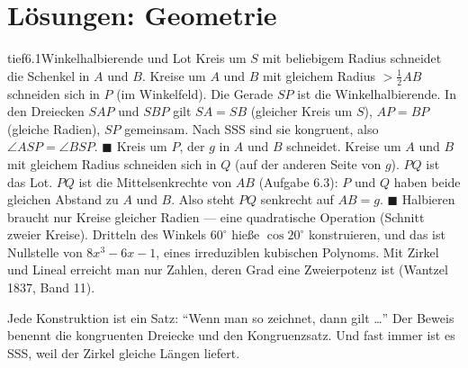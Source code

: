 \chapter{Lösungen: Geometrie}

\begin{loesungkarte}{tief}{6.1}{Winkelhalbierende und Lot}
Kreis um $S$ mit beliebigem Radius schneidet die Schenkel in $A$ und $B$. Kreise um $A$ und $B$ mit gleichem Radius $> \frac12AB$ schneiden sich in $P$ (im Winkelfeld). Die Gerade $SP$ ist die Winkelhalbierende.
In den Dreiecken $SAP$ und $SBP$ gilt $SA = SB$ (gleicher Kreis um $S$), $AP = BP$ (gleiche Radien), $SP$ gemeinsam. Nach SSS sind sie kongruent, also $\angle ASP = \angle BSP$. $\blacksquare$
Kreis um $P$, der $g$ in $A$ und $B$ schneidet. Kreise um $A$ und $B$ mit gleichem Radius schneiden sich in $Q$ (auf der anderen Seite von $g$). $PQ$ ist das Lot.
$PQ$ ist die Mittelsenkrechte von $AB$ (Aufgabe 6.3): $P$ und $Q$ haben beide gleichen Abstand zu $A$ und $B$. Also steht $PQ$ senkrecht auf $AB = g$. $\blacksquare$
Halbieren braucht nur Kreise gleicher Radien --- eine quadratische Operation (Schnitt zweier Kreise). Dritteln des Winkels $60^{\circ}$ hieße $\cos20^{\circ}$ konstruieren, und das ist Nullstelle von $8x^{3} - 6x - 1$, eines irreduziblen kubischen Polynoms. Mit Zirkel und Lineal erreicht man nur Zahlen, deren Grad eine Zweierpotenz ist (Wantzel 1837, Band 11).
\begin{mitnehmen}\kastentext
Jede Konstruktion ist ein Satz: \enquote{Wenn man so zeichnet, dann gilt \dots} Der Beweis benennt die kongruenten Dreiecke und den Kongruenzsatz. Und fast immer ist es SSS, weil der Zirkel gleiche Längen liefert.
\end{mitnehmen}
\end{loesungkarte}

